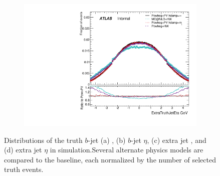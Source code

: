 \begin{figure}
\begin{subfigure}[]{0.45\textwidth}
\end{subfigure}
\begin{subfigure}[]{0.45\textwidth}
\includegraphics[width=\textwidth]{fig/MCComp/ExtraTruthJetEta.pdf}
\end{subfigure}
\caption{Distributions of the truth $b$-jet (a) \pt, (b) $b$-jet $\eta$, (c) extra jet  \pt, and (d) extra jet $\eta$ in \ttbar simulation.Several alternate physics models are compared to the baseline, each normalized by the number of selected truth events.}
\label{fig:truthbjet}
\end{figure}
